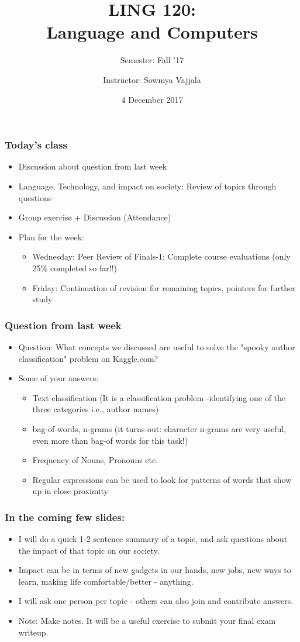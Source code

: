 \documentclass{beamer}
\author[Sowmya Vajjala]{Instructor: Sowmya Vajjala}
\title[LING 120]{LING 120: \\ Language and Computers}
\subtitle{Semester: Fall '17}
\date{4 December 2017}
\institute{Iowa State University, USA}
\begin{document}
\begin{frame}\titlepage
\end{frame}


\begin{frame}
\frametitle{Today's class}
\begin{itemize}
\item Discussion about question from last week
\item Language, Technology, and impact on society: Review of topics through questions 
\item Group exercise + Discussion (Attendance)
\item Plan for the week:
\begin{itemize}
\item Wednesday: Peer Review of Finals-1; Complete course evaluations (only 25\% completed so far!!)
\item Friday: Continuation of revision for remaining topics, pointers for further study
\end{itemize}
\end{itemize}
\end{frame}

\begin{frame}
\frametitle{Question from last week}
\begin{itemize}
\item Question: What concepts we discussed are useful to solve the "spooky author classification" problem on Kaggle.com?
\item Some of your answers:
\begin{itemize}
\item Text classification (It is a classification problem -identifying one of the three categories i.e., author names)
\item bag-of-words, n-grams (it turns out: character n-grams are very useful, even more than bag-of words for this task!)
\item Frequency of Nouns, Pronouns etc.
\item Regular expressions can be used to look for patterns of words that show up in close proximity
\end{itemize}
\end{itemize}
\end{frame}

\begin{frame}
\frametitle{In the coming few slides: }
\begin{itemize}
\item I will do a quick 1-2 sentence summary of a topic, and ask questions about the impact of that topic on our society.
\item Impact can be in terms of new gadgets in our hands, new jobs, new ways to learn, making life comfortable/better - anything.
\item I will ask one person per topic - others can also join and contribute answers.
\item Note: Make notes. It will be a useful exercise to submit your final exam writeup.
\end{itemize}
\end{frame}
\end{document}
